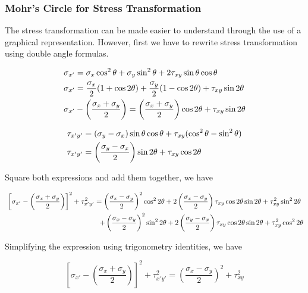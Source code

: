 \documentclass[a4paper,openany,nobib]{tufte-book}
\begin{document}
\subsubsection{Mohr's Circle for Stress Transformation}
\label{mohrs-circle-for-stress-transformation}
The stress transformation can be made easier to understand through the
use of a graphical representation. However, first we have to rewrite
stress transformation using double angle formulas.

$$\begin{gathered}
  \sigma_{x'} = \sigma_x\cos^2\theta  + \sigma_y\sin^2\theta  + 2\tau_{xy}\sin \theta \cos \theta  \hfill \\
  \sigma _{x'} = \frac{\sigma_x}{2}(1 + \cos 2\theta ) + \frac{\sigma_y}{2}(1 - \cos 2\theta ) + {\tau_{xy}}\sin 2\theta  \hfill \\
  \sigma_{x'} - \left( \frac{\sigma_x + \sigma_y}{2} \right) = \left( \frac{\sigma_x + \sigma_y}{2} \right)\cos 2\theta  + {\tau_{xy}}\sin 2\theta  \hfill \\ 
\end{gathered}$$

$$\begin{gathered}
  \tau_{x'y'} = (\sigma_y - \sigma_x)\sin \theta \cos \theta  + \tau_{xy}(\cos^2\theta  - \sin^2\theta ) \\
  \tau_{x'y'} = \left( \frac{\sigma_y - \sigma_x}{2} \right)\sin 2\theta  + \tau _{xy}\cos 2\theta \hfill \\ 
\end{gathered}$$

Square both expressions and add them together, we have

$$\begin{gathered}
    \left[ \sigma_{x'} - \left( \frac{\sigma_x + \sigma_y}{2} \right) \right]^2 + \tau_{x'y'}^2 = \left( \frac{\sigma_x - \sigma_y}{2} \right)^2\cos^2 2\theta  + 2\left( \frac{\sigma_x - \sigma_y}{2} \right)\tau_{xy}\cos 2\theta \sin 2\theta  + \tau_{xy}^2\sin^2 2\theta \\
    \hspace{4.7cm} + \left( \frac{\sigma_x - \sigma_y}{2} \right)^2 \sin^2 2\theta  + 2\left( \frac{\sigma_y - \sigma_x}{2} \right)\tau_{xy}\cos 2\theta \sin 2\theta  + \tau_{xy}^2\cos^2 2\theta \\ 
\end{gathered}$$

Simplifying the expression using trigonometry identities, we have

$$\left[ \sigma_{x'} - \left( \frac{\sigma_x + \sigma_y}{2} \right) \right]^2 + \tau_{x'y'}^2 = \left( \frac{\sigma_x - \sigma_y}{2} \right)^2 + \tau_{xy}^2$$
\end{document}
